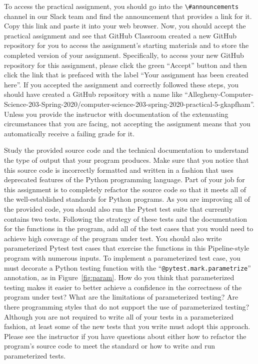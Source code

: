 \documentclass[11pt]{article}
\newcommand{\command}[1]{``\lstinline{#1}''}
\newcommand{\channel}[1]{\lstinline{#1}}
\begin{document}
To access the practical assignment, you should go into the
\channel{\#announcements} channel in our Slack team and find the announcement
that provides a link for it. Copy this link and paste it into your web browser.
Now, you should accept the practical assignment and see that GitHub Classroom
created a new GitHub repository for you to access the assignment's starting
materials and to store the completed version of your assignment. Specifically,
to access your new GitHub repository for this assignment, please click the green
``Accept'' button and then click the link that is prefaced with the label ``Your
assignment has been created here''. If you accepted the assignment and correctly
followed these steps, you should have created a GitHub repository with a name
like
``Allegheny-Computer-Science-203-Spring-2020/computer-science-203-spring-2020-practical-5-gkapfham''.
Unless you provide the instructor with documentation of the extenuating
circumstances that you are facing, not accepting the assignment means that you
automatically receive a failing grade for it.

Study the provided source code and the technical documentation to understand the
type of output that your program produces.
%
Make sure that you notice that this source code is incorrectly formatted and
written in a fashion that uses deprecated features of the Python programming
language.
%
Part of your job for this assignment is to completely refactor the source code
so that it meets all of the well-established standards for Python programs.
%
As you are improving all of the provided code, you should also run the Pytest
test suite that currently contains two tests. Following the strategy of these
tests and the documentation for the functions in the program, add all of the
test cases that you would need to achieve high coverage of the program under
test.
%
You should also write parameterized Pytest test cases that exercise the
functions in this Pipeline-style program with numerous inputs. To implement a
parameterized test case, you must decorate a Python testing function with the
\command{@pytest.mark.parametrize} annotation, as in Figure~\ref{fig:param}. How
do you think that parameterized testing makes it easier to better achieve a
confidence in the correctness of the program under test? What are the
limitations of parameterized testing? Are there programming styles that do not
support the use of parameterized testing?
%
Although you are not required to write all of your tests in a parameterized
fashion, at least some of the new tests that you write must adopt this approach.
%
Please see the instructor if you have questions about either how to refactor the
program's source code to meet the standard or how to write and run parameterized
tests.
\end{document}
